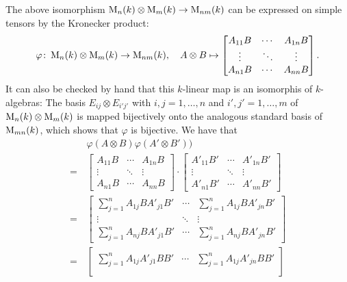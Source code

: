 \begin{remark}
  The above isomorphism $\operatorname{M}_n(k) \otimes \operatorname{M}_m(k) \to \operatorname{M}_{nm}(k)$ can be expressed on simple tensors by the Kronecker product:
  \[
            \varphi
    \colon  \operatorname{M}_n(k) \otimes \operatorname{M}_m(k)
    \to     \operatorname{M}_{nm}(k),
    \quad   A \otimes B
    \mapsto \begin{bmatrix}
              A_{11} B  & \cdots  & A_{1n} B  \\
              \vdots    & \ddots  & \vdots    \\
              A_{n1} B  & \cdots  & A_{nn} B
            \end{bmatrix}.
  \]
  It can also be checked by hand that this $k$-linear map is an isomorphis of $k$-algebras:
  The basis $E_{ij} \otimes E_{i'j'}$ with $i,j = 1, \dotsc, n$ and $i', j' = 1, \dotsc, m$ of $\operatorname{M}_n(k) \otimes \operatorname{M}_m(k)$ is mapped bijectively onto the analogous standard basis of $\operatorname{M}_{mn}(k)$, which shows that $\varphi$ is bijective.
  We have that
  \begingroup
  \allowdisplaybreaks
  \begin{align*}
      &\,  \varphi(A \otimes B) \varphi(A' \otimes B'))
    \\
    =&\,  \begin{bmatrix}
            A_{11} B  & \cdots  & A_{1n} B  \\
            \vdots    & \ddots  & \vdots    \\
            A_{n1} B  & \cdots  & A_{nn} B
          \end{bmatrix}
          \cdot
          \begin{bmatrix}
            A'_{11} B'  & \cdots  & A'_{1n} B'  \\
            \vdots      & \ddots  & \vdots      \\
            A'_{n1} B'  & \cdots  & A'_{nn} B'
          \end{bmatrix}
    \\
    =&\,  \begin{bmatrix}
            \sum_{j=1}^n A_{1j} B A'_{j1} B'  & \cdots  & \sum_{j=1}^n A_{1j} B A'_{jn} B'  \\
            \vdots                            & \ddots  & \vdots                            \\
            \sum_{j=1}^n A_{nj} B A'_{j1} B'  & \cdots  & \sum_{j=1}^n A_{nj} B A'_{jn} B'
          \end{bmatrix}
    \\
    =&\,  \begin{bmatrix}
            \sum_{j=1}^n A_{1j} A'_{j1} B B'  & \cdots  & \sum_{j=1}^n A_{1j} A'_{jn} B B'  \\

\end{bmatrix}
\end{align*}
\end{remark}

